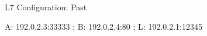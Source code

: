 \documentclass[black,white]{beamer}
\DeclareRobustCommand{\#}{\adjustbox{valign=B,totalheight=.57\baselineskip}{\oldhash}}%
\begin{document}
    \begin{frame}{L7 Configuration: Past}
        \centering
        \begin{overprint}
        \end{overprint}
        A: 192.0.2.3:33333 ; B: 192.0.2.4:80 ; L: 192.0.2.1:12345
    \end{frame}
\end{document}

